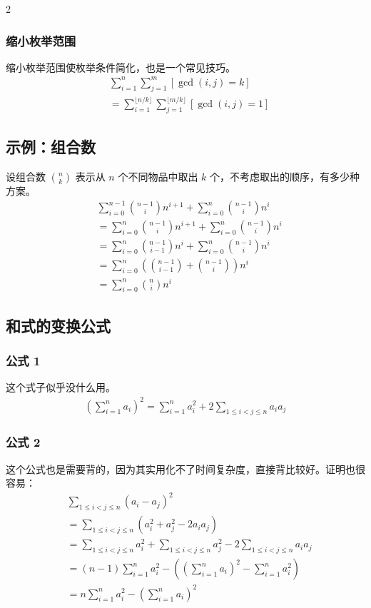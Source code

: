 \documentclass[8pt,a4paper]{article}
\begin{document}
\begin{multicols}{2}
    \subsubsection{缩小枚举范围}
    缩小枚举范围使枚举条件简化，也是一个常见技巧。
    \begin{align*}
        &\sum_{i=1}^{n} \sum_{j=1}^{m} [\gcd(i,j) = k] \\
        &= \sum_{i=1}^{\lfloor n/k \rfloor} \sum_{j=1}^{\lfloor m/k \rfloor} [\gcd(i,j)=1]
    \end{align*}

    \subsection{示例：组合数}
    设组合数 $\binom{n}{k}$ 表示从 $n$ 个不同物品中取出 $k$ 个，不考虑取出的顺序，有多少种方案。
    \begin{align*}
        &\sum_{i=0}^{n-1} \binom{n-1}{i} n^{i+1} + \sum_{i=0}^{n} \binom{n-1}{i} n^i \\
        &= \sum_{i=0}^{n} \binom{n-1}{i} n^{i+1} + \sum_{i=0}^{n} \binom{n-1}{i} n^i \\
        &= \sum_{i=0}^{n} \binom{n-1}{i-1} n^{i} + \sum_{i=0}^{n} \binom{n-1}{i} n^i \\
        &= \sum_{i=0}^{n} \left(\binom{n-1}{i-1} + \binom{n-1}{i}\right) n^i \\
        &= \sum_{i=0}^{n} \binom{n}{i} n^i
    \end{align*}

    \subsection{和式的变换公式}
    \subsubsection{公式 1}
    这个式子似乎没什么用。
    \begin{align*}
        \left(\sum_{i=1}^{n} a_i\right)^2 = \sum_{i=1}^{n} a_i^2 + 2 \sum_{1 \le i < j \le n} a_i a_j
    \end{align*}

    \subsubsection{公式 2}
    这个公式也是需要背的，因为其实用化不了时间复杂度，直接背比较好。证明也很容易：
    \begin{align*}
        &\sum_{1 \le i < j \le n} (a_i - a_j)^2 \\
        &= \sum_{1 \le i < j \le n} (a_i^2 + a_j^2 - 2a_i a_j) \\
        &= \sum_{1 \le i < j \le n} a_i^2 + \sum_{1 \le i < j \le n} a_j^2 - 2\sum_{1 \le i < j \le n} a_i a_j \\
        &= (n-1)\sum_{i=1}^{n} a_i^2 - \left(\left(\sum_{i=1}^{n} a_i\right)^2 - \sum_{i=1}^{n} a_i^2\right) \\
        &= n \sum_{i=1}^{n} a_i^2 - \left(\sum_{i=1}^{n} a_i\right)^2
    \end{align*}


\end{multicols}
\end{document}
